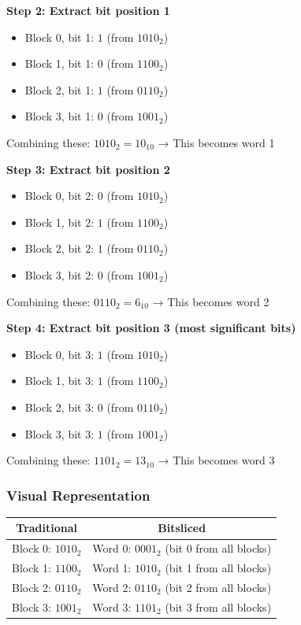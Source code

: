 \documentclass[11pt,a4paper]{article}
\begin{document}
\textbf{Step 2: Extract bit position 1}
\begin{itemize}
    \item Block 0, bit 1: $1$ (from $1010_2$)
    \item Block 1, bit 1: $0$ (from $1100_2$)
    \item Block 2, bit 1: $1$ (from $0110_2$)
    \item Block 3, bit 1: $0$ (from $1001_2$)
\end{itemize}
Combining these: $1010_2 = 10_{10}$ → This becomes word 1

\textbf{Step 3: Extract bit position 2}
\begin{itemize}
    \item Block 0, bit 2: $0$ (from $1010_2$)
    \item Block 1, bit 2: $1$ (from $1100_2$)
    \item Block 2, bit 2: $1$ (from $0110_2$)
    \item Block 3, bit 2: $0$ (from $1001_2$)
\end{itemize}
Combining these: $0110_2 = 6_{10}$ → This becomes word 2

\textbf{Step 4: Extract bit position 3 (most significant bits)}
\begin{itemize}
    \item Block 0, bit 3: $1$ (from $1010_2$)
    \item Block 1, bit 3: $1$ (from $1100_2$)
    \item Block 2, bit 3: $0$ (from $0110_2$)
    \item Block 3, bit 3: $1$ (from $1001_2$)
\end{itemize}
Combining these: $1101_2 = 13_{10}$ → This becomes word 3

\subsubsection{Visual Representation}

\begin{center}
\begin{tabular}{|c|c|}
\hline
\textbf{Traditional} & \textbf{Bitsliced} \\
\hline
Block 0: $1010_2$ & Word 0: $0001_2$ (bit 0 from all blocks) \\
Block 1: $1100_2$ & Word 1: $1010_2$ (bit 1 from all blocks) \\
Block 2: $0110_2$ & Word 2: $0110_2$ (bit 2 from all blocks) \\
Block 3: $1001_2$ & Word 3: $1101_2$ (bit 3 from all blocks) \\
\hline
\end{tabular}
\end{center}
\end{document}
